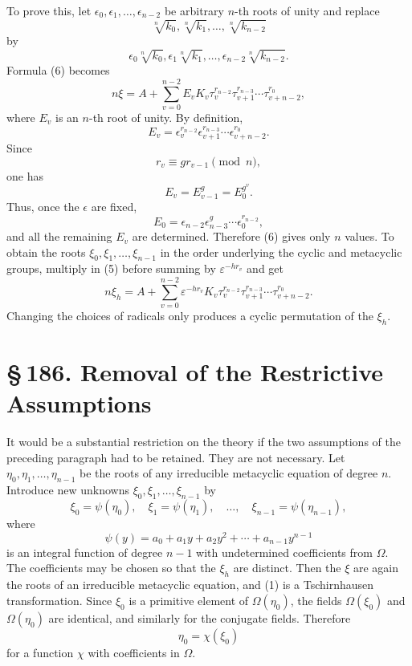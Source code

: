 \documentclass[11pt]{article}
\providecommand{\sect}[2]{\section*{\S\,#1. #2}}
\begin{document}
To prove this, let $\epsilon_0,\epsilon_1,\ldots,\epsilon_{n-2}$ be arbitrary $n$-th roots of unity and replace
\[
  \sqrt[n]{k_0},\sqrt[n]{k_1},\ldots,\sqrt[n]{k_{n-2}}
\]
by
\[
  \epsilon_0\sqrt[n]{k_0},\epsilon_1\sqrt[n]{k_1},\ldots,
  \epsilon_{n-2}\sqrt[n]{k_{n-2}}.
\]
Formula (6) becomes
\begin{equation}\tag{9}
  n\xi=A+
  \sum_{v=0}^{n-2}E_vK_v\tau_v^{r_{n-2}}\tau_{v+1}^{r_{n-3}}\cdots\tau_{v+n-2}^{r_0},
\end{equation}
where $E_v$ is an $n$-th root of unity. By definition,
\begin{equation}\tag{10}
  E_v=\epsilon_v^{r_{n-2}}\epsilon_{v+1}^{r_{n-3}}\cdots\epsilon_{v+n-2}^{r_0}.
\end{equation}
Since
\begin{equation}\tag{11}
  r_v\equiv gr_{v-1}\pmod n,
\end{equation}
one has
\begin{equation}\tag{12}
  E_v=E_{v-1}^{g}=E_0^{g^v}.
\end{equation}
Thus, once the $\epsilon$ are fixed,
\begin{equation}\tag{13}
  E_0=\epsilon_{n-2}\epsilon_{n-3}^{g}\cdots \epsilon_0^{r_{n-2}},
\end{equation}
and all the remaining $E_v$ are determined. Therefore (6) gives only $n$ values. To obtain the roots $\xi_0,\xi_1,\ldots,\xi_{n-1}$ in the order underlying the cyclic and metacyclic groups, multiply in (5) before summing by $\varepsilon^{-hr_v}$ and get
\begin{equation}\tag{14}
  n\xi_h=A+
  \sum_{v=0}^{n-2}\varepsilon^{-hr_v}K_v\tau_v^{r_{n-2}}\tau_{v+1}^{r_{n-3}}\cdots\tau_{v+n-2}^{r_0}.
\end{equation}
Changing the choices of radicals only produces a cyclic permutation of the $\xi_h$.

\sect{186}{Removal of the Restrictive Assumptions}

It would be a substantial restriction on the theory if the two assumptions of the preceding paragraph had to be retained. They are not necessary. Let $\eta_0,\eta_1,\ldots,\eta_{n-1}$ be the roots of any irreducible metacyclic equation of degree $n$. Introduce new unknowns $\xi_0,\xi_1,\ldots,\xi_{n-1}$ by
\begin{equation}\tag{1}
  \xi_0=\psi(\eta_0),\quad \xi_1=\psi(\eta_1),\quad\ldots,\quad
  \xi_{n-1}=\psi(\eta_{n-1}),
\end{equation}
where
\begin{equation}\tag{2}
  \psi(y)=a_0+a_1y+a_2y^2+\cdots+a_{n-1}y^{n-1}
\end{equation}
is an integral function of degree $n-1$ with undetermined coefficients from $\Omega$. The coefficients may be chosen so that the $\xi_h$ are distinct. Then the $\xi$ are again the roots of an irreducible metacyclic equation, and (1) is a Tschirnhausen transformation. Since $\xi_0$ is a primitive element of $\Omega(\eta_0)$, the fields $\Omega(\xi_0)$ and $\Omega(\eta_0)$ are identical, and similarly for the conjugate fields. Therefore
\begin{equation}\tag{3}
  \eta_0=\chi(\xi_0)
\end{equation}
for a function $\chi$ with coefficients in $\Omega$.
\end{document}
